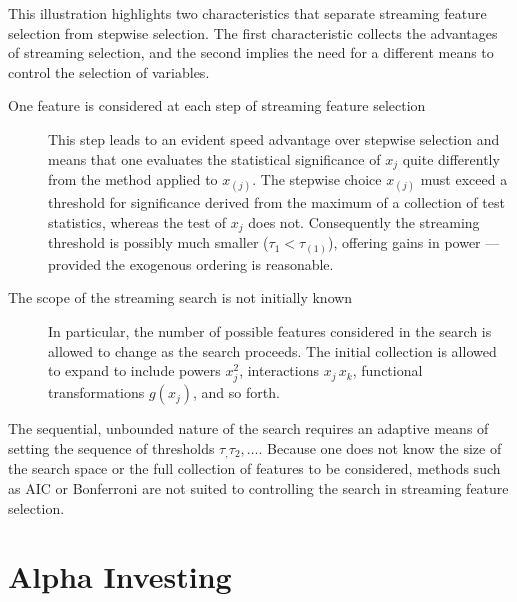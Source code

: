 \documentclass[12pt]{article}
\begin{document}
 This illustration highlights two characteristics that separate streaming
 feature selection from stepwise selection.  The first characteristic collects
 the advantages of streaming selection, and the second implies the need for a
 different means to control the selection of variables.
 \begin{description}
  \item[One feature is considered at each step of streaming feature selection]
 This step leads to an evident speed advantage over stepwise selection and means
 that one evaluates the statistical significance of $x_j$ quite differently from
 the method applied to $x_{(j)}$.  The stepwise choice $x_{(j)}$ must exceed a
 threshold for significance derived from the maximum of a collection of test
 statistics, whereas the test of $x_j$ does not. Consequently the streaming
 threshold is possibly much smaller ($\tau_1 < \tau_{(1)}$), offering gains in
 power --- provided the exogenous ordering is reasonable.
  \item[The scope of the streaming search is not initially known] In particular,
 the number of possible features considered in the search is allowed to change
 as the search proceeds.  The initial collection is allowed to expand to include
 powers $x_j^2$, interactions $x_j\,x_k$, functional transformations $g(x_j)$,
 and so forth.
 \end{description}
 The sequential, unbounded nature of the search requires an adaptive means of
 setting the sequence of thresholds $\tau_, \tau_2, \ldots$.  Because one does
 not know the size of the search space or the full collection of features to be
 considered, methods such as AIC or Bonferroni are not suited to controlling the
 search in streaming feature selection.


\section{Alpha Investing}
\end{document}
